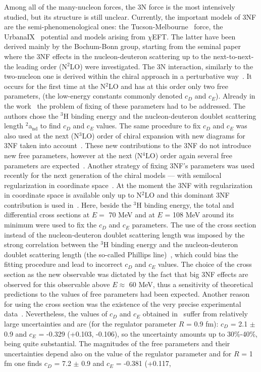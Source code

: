 Among all of the many-nucleon forces, the 3N force is the most intensively studied, but its structure is still unclear. Currently, the important models of 3NF are the semi-phenomenological ones: the Tucson-Melbourne~\cite{coon1979two, coon1981two, coon2001reworking} force, the UrbanaIX~\cite{pudliner1997quantum} potential and models arising from $\chi$EFT. The latter have been derived mainly by the Bochum-Bonn group, starting from the seminal paper~\cite{epelbaum2001three} where the 3NF effects in the nucleon-deuteron scattering up to the next-to-next-the leading order (N$^{2}$LO) were investigated. The 3N interaction, similarly to the two-nucleon one is derived within the chiral approach in a perturbative way~\cite{Epelbaum2009, Machleidt2011}. It occurs for the first time at the N$^{2}$LO and has at this order only two free parameters, (the low-energy constants commonly denoted $c_{D}$ and $c_{E}$). Already in the work~\cite{epelbaum2001three} the problem of fixing of these parameters had to be addressed. The authors chose the $^{3}$H binding energy and the nucleon-deuteron doublet scattering length $^{2}$a$_{\textrm{nd}}$  to find $c_{D}$ and $c_{E}$ values. The same procedure to fix $c_{D}$ and $c_{E}$ was also used at the next (N$^{3}$LO) order of chiral expansion with new diagrams for 3NF taken into account~\cite{skibinski2011triton}. These new contributions to the 3NF do not introduce new free parameters, however at the next (N$^{4}$LO) order again several free parameters are expected~\cite{girlanda2011subleading}. Another strategy of fixing 3NF's parameters was used recently for the next generation of the chiral models --- with semilocal regularization in coordinate space~\cite{epelbaum2019few}. At the moment the 3NF with regularization in coordinate space is available only up to N$^{2}$LO and this dominant 3NF contribution is used in~\cite{epelbaum2019few}. Here, beside the $^{3}$H binding energy, the total and differential cross sections at $E =$ 70 MeV and at $E$ = 108 MeV around its minimum were used to fix the $c_{D}$ and $c_{E}$ parameters. The use of the cross section instead of the nucleon-deuteron doublet scattering length was imposed by the strong correlation between the $^{3}$H binding energy and the nucleon-deuteron doublet scattering length (the so-called Phillips line)~\cite{phillips1968consistency}, which could bias the fitting procedure and lead to incorrect $c_{D}$ and $c_{E}$ values. The choice of the cross section as the new observable was dictated by the fact that big 3NF effects are observed for this observable above $E\approx$ 60 MeV, thus a sensitivity of theoretical predictions to the values of free parameters had been expected. Another reason for using the cross section was the existence of the very precise experimental data~\cite{sekiguchi}. Nevertheless, the values of $c_{D}$ and $c_{E}$ obtained in~\cite{epelbaum2019few} suffer from relatively large uncertainties and are (for the regulator parameter $R$ = 0.9 fm): $c_{D}$ = 2.1 $\pm$ 0.9 and $c_{E}$ = -0.329 (+0.103, -0.106), so the uncertainty amounts up to 30\%-40\%, being quite substantial. The magnitudes of the free parameters and their uncertainties depend also on the value of the regulator parameter and for $R$ = 1 fm one finds $c_{D}$ = 7.2 $\pm$ 0.9 and $c_{E}$ = -0.381 (+0.117, 